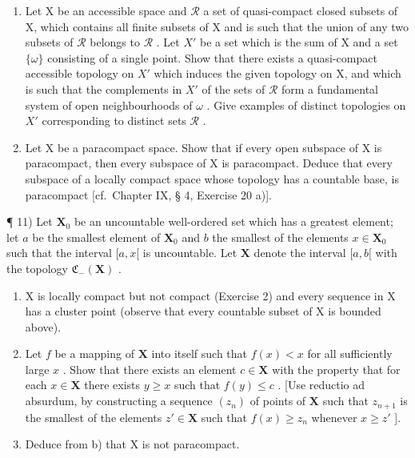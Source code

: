\begin{enumerate}
\def\labelenumi{\arabic{enumi})}
\setcounter{enumi}{8}
\item
  Let X be an accessible space and \(\mathcal{R}\) a set of quasi-compact closed subsets of X, which contains all finite subsets of X and is such that the union of any two subsets of \(\mathcal{R}\) belongs to \(\mathcal{R}\) . Let \(X'\) be a set which is the sum of X and a set \(\{\omega\}\) consisting of a single point. Show that there exists a quasi-compact accessible topology on \(X'\) which induces the given topology on X, and which is such that the complements in \(X'\) of the sets of \(\mathcal{R}\) form a fundamental system of open neighbourhoods of \(\omega\) . Give examples of distinct topologies on \(X'\) corresponding to distinct sets \(\mathcal{R}\) .
\item
  Let X be a paracompact space. Show that if every open subspace of X is paracompact, then every subspace of X is paracompact. Deduce that every subspace of a locally compact space whose topology has a countable base, is paracompact {[}cf.~Chapter IX, § 4, Exercise 20 a){]}.
\end{enumerate}

¶ 11) Let \(\mathbf{X}_0\) be an uncountable well-ordered set which has a greatest element; let \(a\) be the smallest element of \(\mathbf{X}_0\) and \(b\) the smallest of the elements \(x \in \mathbf{X}_0\) such that the interval \([a, x[\) is uncountable. Let \(\mathbf{X}\) denote the interval \([a, b[\) with the topology \(\mathfrak{C}_{-}(\mathbf{X})\) .

\begin{enumerate}
\def\labelenumi{\alph{enumi})}
\item
  X is locally compact but not compact (Exercise 2) and every sequence in X has a cluster point (observe that every countable subset of X is bounded above).
\item
  Let \(f\) be a mapping of \(\mathbf{X}\) into itself such that \(f(x) < x\) for all sufficiently large \(x\) . Show that there exists an element \(c \in \mathbf{X}\) with the property that for each \(x \in \mathbf{X}\) there exists \(y \geqslant x\) such that \(f(y) \leqslant c\) . {[}Use reductio ad absurdum, by constructing a sequence \((z_n)\) of points of \(\mathbf{X}\) such that \(z_{n+1}\) is the smallest of the elements \(z' \in \mathbf{X}\) such that \(f(x) \geqslant z_n\) whenever \(x \geqslant z'\) {]}.
\item
  Deduce from b) that X is not paracompact.
\end{enumerate}

